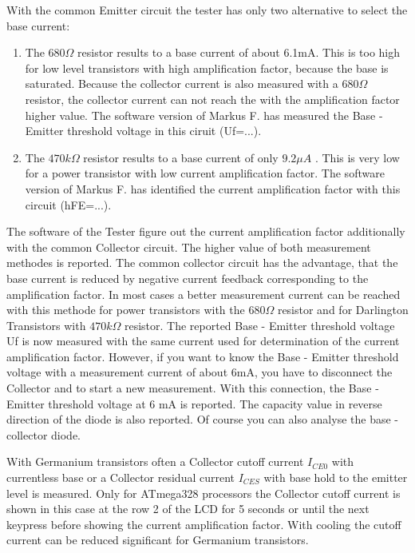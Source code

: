 With the common Emitter circuit the tester has only two alternative to select the base current:
\begin{enumerate}
\item The \(680 \Omega\) resistor results to a base current of about 6.1mA. 
This is too high for low level transistors with high amplification factor, because the base is saturated.
Because the collector current is also measured with a \(680 \Omega\) resistor, the collector current
can not reach the with the amplification factor higher value.
The software version of Markus F. has measured the Base - Emitter threshold voltage in this ciruit (Uf=...).\\
\item The \(470 k\Omega\) resistor results to a base current of only \(9.2 \mu A\) .
This is very low for a power transistor with low current amplification factor.
The software version of Markus F. has identified the current amplification factor with this circuit (hFE=...).\\
\end{enumerate}

The software of the Tester figure out the current amplification factor additionally with the common Collector circuit.
The higher value of both measurement methodes is reported.
The common collector circuit has the advantage, that the base current is reduced by negative current feedback corresponding
to the amplification factor. 
In most cases a better measurement current can be reached with this methode for power transistors
with the \(680 \Omega\) resistor and for Darlington Transistors with \(470 k\Omega\) resistor.
The reported Base - Emitter threshold voltage Uf is now measured with the same current used 
for determination of the current amplification factor.
However, if you want to know the Base - Emitter threshold voltage with a measurement current of about 6mA,
you have to disconnect the Collector and to start a new measurement.
With this connection, the Base - Emitter threshold voltage at 6 mA is reported. The capacity value
in reverse direction of the diode is also reported.
Of course you can also analyse the base - collector diode.

With Germanium transistors often a Collector cutoff current \(I_{CE0}\) with currentless base or 
a Collector residual current \(I_{CES}\) with base hold to the emitter level is measured.
Only for ATmega328 processors the Collector cutoff current is shown in this case at the row 2 of the LCD 
for 5 seconds or until the next keypress before showing the current amplification factor. 
With cooling the cutoff current can be reduced significant for Germanium transistors.


